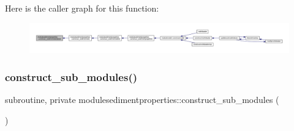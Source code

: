 Here is the caller graph for this function\+:\nopagebreak
\begin{figure}[H]
\begin{center}
\leavevmode
\includegraphics[width=350pt]{namespacemodulesedimentproperties_a6a52cd2ecac4c72aa40426e7ed1e0616_icgraph}
\end{center}
\end{figure}
\mbox{\label{namespacemodulesedimentproperties_a908a832201f28cb160dc5c859ab8af03}} 
\subsubsection{\texorpdfstring{construct\+\_\+sub\+\_\+modules()}{construct\_sub\_modules()}}
{\footnotesize\ttfamily subroutine, private modulesedimentproperties\+::construct\+\_\+sub\+\_\+modules (\begin{DoxyParamCaption}{ }\end{DoxyParamCaption})\hspace{0.3cm}{\ttfamily [private]}}

